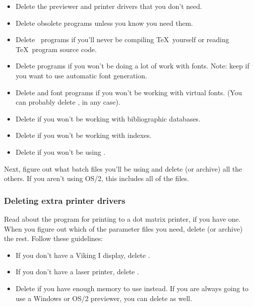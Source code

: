 \begin{itemize}
  \item Delete the previewer and printer drivers that you don't need.
  \item Delete obsolete programs unless you know you need them.
  \item Delete \web\ programs if you'll never be compiling \TeX\ yourself
        or reading \TeX\ program source code.
  \item Delete  programs if you won't be doing a lot of work with
        fonts.  Note: keep  if you want to use
        automatic font generation.
  \item Delete  and  font programs if you won't be working
        with virtual fonts. (You can probably delete ,
        in any case).
  \item Delete  if you won't be working with 
        bibliographic databases.
  \item Delete  if you won't be working with indexes.
  \item Delete  if you won't be using .
\end{itemize}

Next, figure out what batch files you'll be using and delete (or archive)
all the others.  If you aren't using OS/2, this includes all of the
 files.

\subsubsection{Deleting extra printer drivers}

Read about the  program for printing to a dot matrix
printer, if you have one.  When you figure out which of the 
parameter files you need, delete (or archive) the rest.  Follow these
guidelines:

\begin{itemize}
\item If you don't have a Viking I display, delete .

\item If you don't have a laser printer, delete .

\item Delete  if you have enough memory to use 
      instead.  If you are always going to use a Windows or OS/2 previewer,
      you can delete  as well.
\end{itemize}

